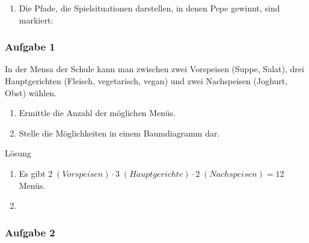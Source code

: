 \documentclass[
  ngerman,
]{book}
\providecommand{\tightlist}{%
  \setlength{\itemsep}{0pt}\setlength{\parskip}{0pt}}
\begin{document}
\begin{enumerate}
\def\labelenumi{\alph{enumi})}
\setcounter{enumi}{1}
\tightlist
\item
  Die Pfade, die Spielsituationen darstellen, in denen Pepe gewinnt, sind markiert:
\end{enumerate}

\hypertarget{section-105}{%
\subsubsection*{}\label{section-105}}

\hypertarget{aufgabe-1-11}{%
\subsubsection*{Aufgabe 1}\label{aufgabe-1-11}}

In der Mensa der Schule kann man zwischen zwei Vorspeisen (Suppe, Salat), drei Hauptgerichten (Fleisch, vegetarisch, vegan) und zwei Nachspeisen (Joghurt, Obst) wählen.

\begin{enumerate}
\def\labelenumi{\alph{enumi})}
\item
  Ermittle die Anzahl der möglichen Menüs.
\item
  Stelle die Möglichkeiten in einem Baumdiagramm dar.
\end{enumerate}

Lösung

\begin{enumerate}
\def\labelenumi{\alph{enumi})}
\item
  Es gibt \(2\;(Vorspeisen) \cdot 3\;(Hauptgerichte) \cdot 2\;(Nachspeisen) = 12\) Menüs.
\item
\end{enumerate}

\hypertarget{section-106}{%
\subsubsection*{}\label{section-106}}

\hypertarget{aufgabe-2-11}{%
\subsubsection*{Aufgabe 2}\label{aufgabe-2-11}}
\end{document}
